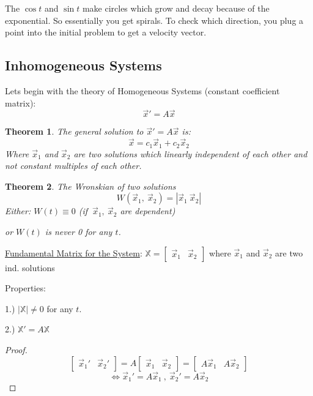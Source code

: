\documentclass[12pt]{article}
\numberwithin{equation}{subsection}
\newtheorem{theorem}{Theorem}[section]
\newcommand{\absp}[1]{\left\vert #1 \right\vert}
\newcommand{\inda}{\hspace{.5cm}}
\newcommand{\indd}{\hspace{2cm}}
\newcommand{\inde}{\hspace{2.5cm}}
\begin{document}
The $\cos t$ and $\sin t$ make circles which grow and decay because of the exponential. So essentially you get spirals. To check which direction, you plug a point into the initial problem to get a velocity vector.










\newpage
\subsection{Inhomogeneous Systems}
\inda Lets begin with the theory of Homogeneous Systems (constant coefficient matrix):
\begin{equation}
\vec{x}'=A\vec{x}
\end{equation}

\begin{theorem}
The general solution to $\vec{x}'=A\vec{x}$ is:
\begin{equation}
\vec{x}=c_1\vec{x}_1+c_2\vec{x}_2
\end{equation}
Where $\vec{x}_1$ and $\vec{x}_2$ are two solutions which linearly independent of each other and not constant multiples of each other.
\end{theorem}

\begin{theorem}
The Wronskian of two solutions
\begin{equation}
W(\vec{x}_1,\ \vec{x}_2)= \absp{\vec{x}_1\ \vec{x}_2}
\end{equation}
Either: $W(t)\equiv 0$ (if $\ \vec{x}_1, \ \vec{x}_2$ are dependent)

\inda or $W(t)$ is never 0 for any $t$.
\end{theorem}

\underline{Fundamental Matrix for the System}: $\mathbb{X}=\begin{bmatrix}
\vec{x}_1 & \vec{x}_2
\end{bmatrix}$ where $\vec{x}_1$ and $\vec{x}_2$ are two ind. solutions

\indd Properties:

\inde 1.) $\absp{\mathbb{X}}\neq 0$ for any $t$.

\inde 2.) $\mathbb{X}' = A\mathbb{X}$ 

\begin{proof}
\begin{equation}
\begin{bmatrix}
\vec{x}_1' & \vec{x}_2'
\end{bmatrix}
=A\begin{bmatrix}
\vec{x}_1 & \vec{x}_2
\end{bmatrix}=\begin{bmatrix}
A\vec{x}_1 & A\vec{x}_2
\end{bmatrix}
\end{equation}
\begin{equation}
\Leftrightarrow \vec{x}_1'=A\vec{x}_1 \ , \ \vec{x}_2'=A\vec{x}_2
\end{equation}
\end{proof}
\end{document}
